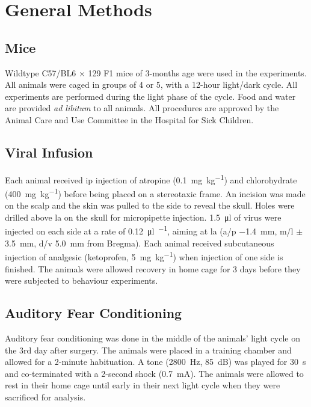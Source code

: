\chapter{General Methods}
\section{Mice}
Wildtype C57/BL6 $\times$ 129 F1 mice of 3-months age were used in the experiments. All animals were caged in groups of 4 or 5, with a 12-hour light/dark cycle. All experiments are performed during the light phase of the cycle. Food and water are provided \textit{ad libitum} to all animals. All procedures are approved by the Animal Care and Use Committee in the Hospital for Sick Children.

\section{Viral Infusion}
Each animal received \gls{ip} injection of atropine (\SI{0.1}{\mg\per\kg}) and chlorohydrate (\SI{400}{\mg\per\kg}) before being placed on a stereotaxic frame. An incision was made on the scalp and the skin was pulled to the side to reveal the skull. Holes were drilled above \gls{la} on the skull for micropipette injection. \SI{1.5}{\ul} of virus were injected on each side at a rate of \SI{0.12}{\ul\per\min}, aiming at \gls{la} (\gls{a/p} \SI{-1.4}{\mm}, \gls{m/l} $\pm$\SI{3.5}{\mm}, \gls{d/v} \SI{5.0}{\mm} from Bregma). Each animal received subcutaneous injection of analgesic (ketoprofen, \SI{5}{\mg\per\kg}) when injection of one side is finished. The animals were allowed recovery in home cage for 3 days before they were subjected to behaviour experiments.

\section{Auditory Fear Conditioning}
Auditory fear conditioning was done in the middle of the animals' light cycle on the 3rd day after surgery. The animals were placed in a training chamber and allowed for a 2-minute habituation. A tone (\SI{2800}{\Hz}, \SI{85}{\dB}) was played for \SI{30}{\second} and co-terminated with a 2-second shock (\SI{0.7}{\mA}). The animals were allowed to rest in their home cage until early in their next light cycle when they were sacrificed for analysis. 
